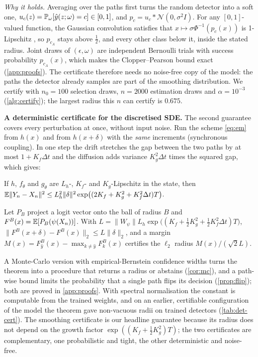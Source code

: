 \emph{Why it holds.} Averaging over the paths first turns the random detector
into a soft one, $u_c(z)=\mathbb{P}_\omega[\hat y(z;\omega)=c]\in[0,1]$, and
$p_c=u_c*\mathcal N(0,\sigma^2I)$. For any $[0,1]$-valued function, the
Gaussian convolution satisfies that $x\mapsto\sigma\Phi^{-1}(p_c(x))$ is
1-Lipschitz \citep[Lemma~2]{salman2019smoothadv}, so $p_{c_A}$ stays above
$\tfrac12$, and every other class below it, inside the stated radius. Joint
draws of $(\epsilon,\omega)$ are independent Bernoulli trials with success
probability $p_{c_A}(x)$, which makes the Clopper--Pearson bound exact
(\cref{app:proofs}). The certificate therefore needs no noise-free copy of the
model: the paths the detector already samples are part of the smoothing
distribution. We certify with $n_0=100$ selection draws, $n=2000$ estimation
draws and $\alpha=10^{-3}$ (\cref{alg:certify}); the largest radius this $n$ can
certify is $0.675$.




\textbf{A deterministic certificate for the discretised SDE.} The second
guarantee covers every perturbation at once, without input noise. Run the scheme
\eqref{eq:em} from $h(x)$ and from $h(x+\delta)$ with the \emph{same} increments
(synchronous coupling). In one step the drift stretches the gap between the two
paths by at most $1+K_f\Delta t$ and the diffusion adds variance $K_g^2\Delta t$
times the squared gap, which gives:

\begin{lemma}\label{lem:ms}
If $h$, $f_\theta$ and $g_\theta$ are $L_h$-, $K_f$- and $K_g$-Lipschitz in the
state, then $\mathbb{E}\|Y_n-X_n\|^2\le L_h^2\|\delta\|^2\exp\bigl((2K_f+K_g^2+K_f^2\Delta t)T\bigr)$.
\end{lemma}

\begin{theorem}\label{thm:mean-cert}
Let $P_B$ project a logit vector onto the ball of radius $B$ and
$F^B(x)=\mathbb{E}[P_B(\psi(X_n))]$. With
$L=\|W_\psi\|L_h\exp\bigl((K_f+\tfrac12K_g^2+\tfrac12K_f^2\Delta t)T\bigr)$,
$\|F^B(x+\delta)-F^B(x)\|_2\le L\|\delta\|_2$, and a margin
$M(x)=F^B_{\hat y}(x)-\max_{k\ne\hat y}F^B_k(x)$ certifies the $\ell_2$ radius
$M(x)/(\sqrt2L)$.
\end{theorem}

A Monte-Carlo version with empirical-Bernstein confidence widths turns the
theorem into a procedure that returns a radius or abstains (\cref{cor:mc}), and
a path-wise bound limits the probability that a single path flips its decision
(\cref{prop:flip}); both are proved in \cref{app:proofs}. With spectral
normalisation the constant is computable from the trained weights, and on an
earlier, certifiable configuration of the model the theorem gave non-vacuous
radii on trained detectors (\cref{tab:det-cert}). The smoothing certificate is
our headline guarantee because its radius does not depend on the growth factor
$\exp((K_f+\frac12K_g^2)T)$; the two certificates are complementary, one
probabilistic and tight, the other deterministic and noise-free.


